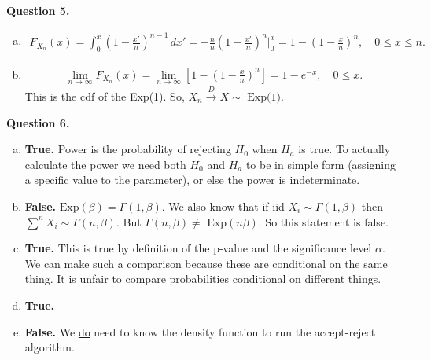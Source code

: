 \documentclass[11pt]{article}
\begin{document}
\newpage

\noindent \textbf{Question 5.}
\begin{enumerate}[(a)]
	\item \begin{align*}
	F_{X_n}(x) = \int_0^x \left(1 - \frac{x'}{n}\right)^{n-1}\,dx' = -\frac{n}{n}\left(1 - \frac{x'}{n}\right)^n\bigg\vert^x_0 = 1 - \left(1 - \frac{x}{n}\right)^n, \quad 0 \leq x \leq n.
	\end{align*}
	
	
	
	\item 
	\begin{align*}
	\lim\limits_{n\to\infty} F_{X_n}(x) = \lim_{n\to \infty} \left[1 - \left(1 - \frac{x}{n}\right)^n\right] = 1 - e^{-x}, \quad 0 \leq x.
	\end{align*}
	This is the cdf of the Exp(1). So, $X_n \xrightarrow{D} X \sim \text{ Exp(1)}$.
	
\end{enumerate}

\newpage

\noindent \textbf{Question 6.}

\begin{enumerate}[(a)]
	\item \textbf{True.} Power is the probability of rejecting $H_0$ when $H_a$ is true. To actually calculate the power we need both $H_0$ and $H_a$ to be in simple form (assigning a specific value to the parameter), or else the power is indeterminate. 
	\item \textbf{False.} $\text{Exp}(\beta) = \Gamma(1,\beta)$. We also know that if iid $X_i \sim \Gamma(1,\beta)$ then $\sum^n X_i \sim \Gamma(n,\beta)$. But $ \Gamma(n,\beta) \neq \text{ Exp}(n\beta)$. So this statement is false.
	\item \textbf{True.} This is true by definition of the p-value and the significance level $\alpha$. We can make such a comparison because these are conditional on the same thing. It is unfair to compare probabilities conditional on different things.
	\item \textbf{True.} 
	\item\textbf{False.} We \underline{do} need to know the density function to run the accept-reject algorithm.
\end{enumerate}




\newpage
\end{document}
